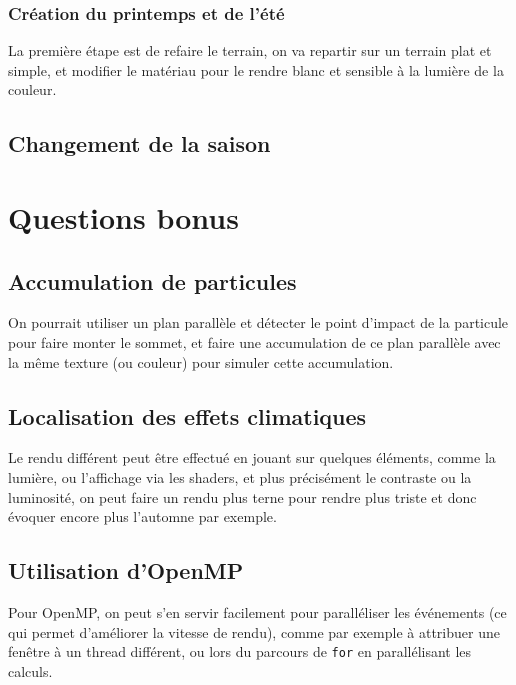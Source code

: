 \documentclass[a4paper,11pt]{report}
\begin{document}
	\subsubsection{Création du printemps et de l'été}
	La première étape est de refaire le terrain, on va repartir sur un terrain plat et simple, et modifier le matériau pour le rendre blanc et sensible à la lumière de la couleur.
	
	\subsection{Changement de la saison}
	
	\pagebreak
	\section{Questions bonus}
	\subsection{Accumulation de particules}
	On pourrait utiliser un plan parallèle et détecter le point d'impact de la particule pour faire monter le sommet, et faire une accumulation de ce plan parallèle avec la même texture (ou couleur) pour simuler cette accumulation.
	
	\subsection{Localisation des effets climatiques}
	Le rendu différent peut être effectué en jouant sur quelques éléments, comme la lumière, ou l'affichage via les shaders, et plus précisément le contraste ou la luminosité, on peut faire un rendu plus terne pour rendre plus triste et donc évoquer encore plus l'automne par exemple.	
	
	\subsection{Utilisation d'OpenMP}
	Pour OpenMP, on peut s'en servir facilement pour paralléliser les événements (ce qui permet d'améliorer la vitesse de rendu), comme par exemple à attribuer une fenêtre à un thread différent, ou lors du parcours de \texttt{for} en parallélisant les calculs.
		
	
\end{document}
